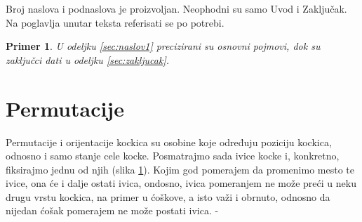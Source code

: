 \documentclass[a4paper]{article}
\newtheorem{primer}{Primer}[section]
\begin{document}
Broj naslova i podnaslova je proizvoljan. Neophodni su samo Uvod i Zaključak. Na poglavlja unutar teksta referisati se po potrebi. 
\begin{primer}
U odeljku \ref{sec:naslov1} precizirani su osnovni pojmovi, dok su zaključci dati u odeljku \ref{sec:zakljucak}.
\end{primer}




\section{Permutacije}
\label{permutacije}

Permutacije i orijentacije kockica su osobine koje određuju poziciju kockica, odnosno i samo stanje cele kocke.
Posmatrajmo sada ivice kocke i, konkretno, fiksirajmo jednu od njih (slika \ref{fig:ivica-pomeranje}). Kojim god pomerajem da promenimo mesto te ivice, ona će i dalje ostati ivica, ondosno, ivica pomeranjem ne može preći u neku drugu vrstu kockica, na primer u ćoškove, a isto važi i obrnuto, odnosno da nijedan ćošak pomerajem ne može postati ivica.
-
\begin{figure}[h]
        \centering
        \caption{}
        \label{fig:ivica-pomeranje}
    \end{figure}
\end{document}
